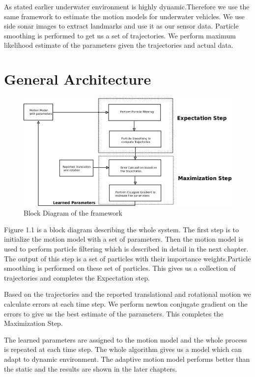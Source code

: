 \documentclass[12pt]{dalcsthesis}
\begin{document}
As stated earlier underwater environment is highly dynamic.Therefore we use the same framework to estimate the motion models for underwater vehicles. We use side sonar images to extract landmarks and use it as our sensor data. Particle smoothing is performed to get us a set of trajectories. We perform maximum likelihood estimate of the parameters given the trajectories and actual data. 

\section{General Architecture}


\begin{figure}[hbtp]
\caption{Block Diagram of the framework}
\centering
\includegraphics[scale=0.5]{Diagram1.jpeg}
\end{figure}



Figure 1.1 is a block diagram describing the whole system. The
first step is to initialize the motion model with a set of parameters.
Then the motion model is used to perform particle filtering which
is described in detail in the next chapter. The output of this step
is a set of particles with their importance weights.Particle smoothing
is performed on these set of particles. This gives us a collection
of trajectories and completes the Expectation step. 

Based on the trajectories and the reported translational and rotational
motion we calculate errors at each time step. We perform newton conjugate
gradient on the errors to give us the best estimate of the parameters.
This completes the Maximization Step.

The learned parameters are assigned to the motion model and the whole
process is repeated at each time step. The whole algorithm gives us
a model which can adapt to dynamic environment. The adaptive motion
model performs better than the static and the results are shown in
the later chapters.
\end{document}
